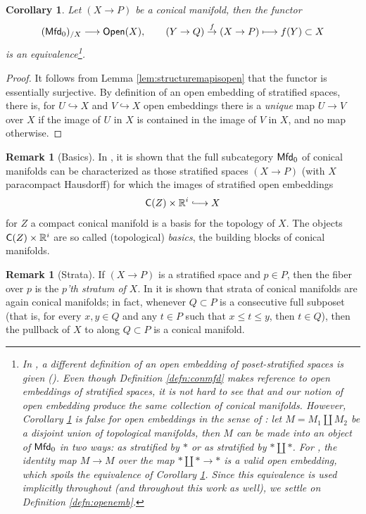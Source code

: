 \documentclass[10pt, reqno, twoside
, final
]{amsart}
\numberwithin{equation}{subsection}%
\theoremstyle{definition}
\theoremstyle{definition}
\theoremstyle{definition}
\theoremstyle{definition}
\theoremstyle{definition}
\theoremstyle{definition}
\theoremstyle{definition}
\theoremstyle{definition}
\theoremstyle{definition}
\theoremstyle{plain}
\theoremstyle{definition}
\theoremstyle{plain}
\theoremstyle{definition}
\theoremstyle{plain}
\newtheorem{cor}[defn]{Corollary}
\theoremstyle{definition}
\newtheorem{rmk}[defn]{Remark}
\theoremstyle{definition}
\theoremstyle{plain}
\theoremstyle{plain}
\theoremstyle{definition}
\theoremstyle{plain}
\theoremstyle{plain}
\theoremstyle{plain}
\begin{document}
\begin{cor}\label{cor:openemb}
Let $(X\rightarrow P)$ be a conical manifold, then the functor 
\[ (\mathsf{Mfd}_0)_{/X} \longrightarrow \mathsf{Open}(X),\qquad (Y\rightarrow Q)\overset{f}{\rightarrow} (X\rightarrow P)\longmapsto f(Y)\subset X\]
is an equivalence\footnote{In \cite{AFT-local-structures}, a different definition of an open embedding of poset-stratified spaces is given (\cite[Definition 2.1.11]{AFT-local-structures}). Even though Definition \ref{defn:conmfd} makes reference to open embeddings of stratified spaces, it is not hard to see that \cite[Definition 2.1.11]{AFT-local-structures} and our notion of open embedding produce the same collection of conical manifolds. However, Corollary \ref{cor:openemb} is false for open embeddings in the sense of \cite{AFT-local-structures}: let $M=M_1\coprod M_2$ be a disjoint union of topological manifolds, then $M$ can be made into an object of $\mathsf{Mfd}_0$ in two ways: as stratified by $*$ or as stratified by $*\coprod *$. For \cite{AFT-local-structures}, the identity map $M\rightarrow M$ over the map $*\coprod *\rightarrow *$ is a valid open embedding, which spoils the equivalence of Corollary \ref{cor:openemb}. Since this equivalence is used implicitly throughout \cite{AFT-local-structures} (and throughout this work as well), we settle on Definition \ref{defn:openemb}.}.
\end{cor}
\begin{proof}
It follows from Lemma \ref{lem:structuremapisopen} that the functor is essentially surjective. By definition of an open embedding of stratified spaces, there is, for $U\hookrightarrow X$ and $V\hookrightarrow X$ open embeddings there is a \emph{unique} map $U\rightarrow V$ over $X$ if the image of $U$ in $X$ is contained in the image of $V$ in $X$, and no map otherwise. 
\end{proof}

\begin{rmk}[Basics]
In \cite{AFT-local-structures}, it is shown that the full subcategory $\mathsf{Mfd}_0$ of conical manifolds can be characterized as those stratified spaces $(X\rightarrow P)$ (with $X$ paracompact Hausdorff) for which the images of stratified open embeddings 
\[  \mathsf{C}(Z)\times \R^i\hooklongrightarrow X \]
for $Z$ a compact conical manifold is a basis for the topology of $X$. The objects $\mathsf{C}(Z)\times \mathbb{R}^i$ are so called (topological) \emph{basics}, the building blocks of conical manifolds.
\end{rmk}

\begin{rmk}[Strata]\label{rmk:strata}
If $(X\rightarrow P)$ is a stratified space and $p\in P$, then the fiber over $p$ is the \emph{$p$'th stratum of $X$}. In \cite[Section 2.3]{AFT-local-structures} it is shown that strata of conical manifolds are again conical manifolds; in fact, whenever $Q\subset P$ is a consecutive full subposet (that is, for every $x,y \in Q$ and any $t\in P$ such that $x\leq t\leq y$, then $t\in Q$), then the pullback of $X$ to along $Q\subset P$ is a conical manifold.
\end{rmk}
\end{document}
